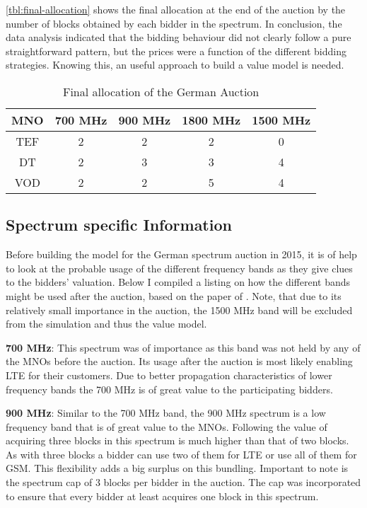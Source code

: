 \autoref{tbl:final-allocation} shows the final allocation at the end of the auction by the number of blocks obtained by each bidder in the spectrum. In conclusion, the data analysis indicated that the bidding behaviour did not clearly follow a pure straightforward pattern, but the prices were a function of the different bidding strategies. Knowing this, an useful approach to build a value model is needed.

\begin{table}[]
	\centering
	\begin{tabular}{|c|c|c|c|c|}
		\hline
		\textbf{MNO} & \textbf{700 MHz} & \textbf{900 MHz} & \textbf{1800 MHz} & \textbf{1500 MHz} \\ \hline
		TEF          & 2                & 2                & 2                 & 0 \\ \hline
		DT           & 2                & 3                & 3                 & 4 \\ \hline
		VOD          & 2                & 2                & 5                 & 4 \\ \hline
	\end{tabular}
	\caption{Final allocation of the German Auction}
	\label{tbl:final-allocation}
\end{table}

\subsection{Spectrum specific Information}\label{subsection:spec_specif_info}
Before building the model for the German spectrum auction in 2015, it is of help to look at the probable usage of the different frequency bands as they give clues to the bidders' valuation. Below I compiled a listing 
on how the different bands might be used after the auction, based on the paper of \citeauthor{Bichler2016}.
Note, that due to its relatively small importance in the auction, the 1500 MHz band will be excluded from the simulation and thus the value model.

\textbf{700 MHz}: This spectrum was of importance as this band was not held by any of the MNOs before the auction. Its usage after the auction is most likely enabling LTE for their customers. Due to better propagation characteristics of lower frequency bands the 700 MHz is of great value to the participating bidders. 

\textbf{900 MHz}: Similar to the 700 MHz band, the 900 MHz spectrum is a low frequency band that is of great value to the MNOs. Following \citeauthor{Bichler2016} the value of acquiring three blocks in this spectrum is much higher than that of two blocks. As with three blocks a bidder can use two of them for LTE or use all of them for GSM. This flexibility adds a big surplus on this bundling. Important to note is the spectrum cap of 3 blocks per bidder in the auction. The cap was incorporated to ensure that every bidder at least acquires one block in this spectrum.

